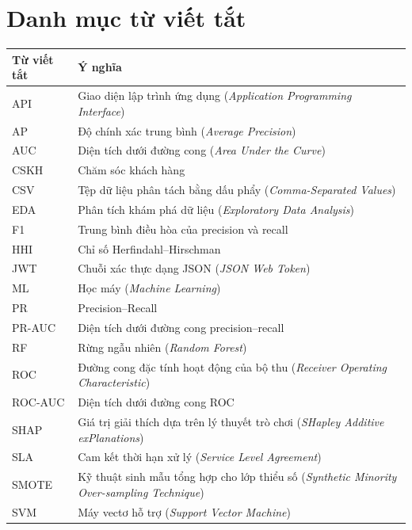 \chapter*{Danh mục từ viết tắt}

\begin{longtable}{@{}p{3.2cm}p{11.5cm}@{}}
\toprule
\textbf{Từ viết tắt} & \textbf{Ý nghĩa} \\
\midrule
\endhead
\bottomrule
\endfoot
API     & Giao diện lập trình ứng dụng (\emph{Application Programming Interface}) \\
AP      & Độ chính xác trung bình (\emph{Average Precision}) \\
AUC     & Diện tích dưới đường cong (\emph{Area Under the Curve}) \\
CSKH    & Chăm sóc khách hàng \\
CSV     & Tệp dữ liệu phân tách bằng dấu phẩy (\emph{Comma-Separated Values}) \\
EDA     & Phân tích khám phá dữ liệu (\emph{Exploratory Data Analysis}) \\
F1      & Trung bình điều hòa của precision và recall \\
HHI     & Chỉ số Herfindahl--Hirschman \\
JWT     & Chuỗi xác thực dạng JSON (\emph{JSON Web Token}) \\
ML      & Học máy (\emph{Machine Learning}) \\
PR      & Precision--Recall \\
PR-AUC  & Diện tích dưới đường cong precision--recall \\
RF      & Rừng ngẫu nhiên (\emph{Random Forest}) \\
ROC     & Đường cong đặc tính hoạt động của bộ thu (\emph{Receiver Operating Characteristic}) \\
ROC-AUC & Diện tích dưới đường cong ROC \\
SHAP    & Giá trị giải thích dựa trên lý thuyết trò chơi (\emph{SHapley Additive exPlanations}) \\
SLA     & Cam kết thời hạn xử lý (\emph{Service Level Agreement}) \\
SMOTE   & Kỹ thuật sinh mẫu tổng hợp cho lớp thiểu số (\emph{Synthetic Minority Over-sampling Technique}) \\
SVM     & Máy vectơ hỗ trợ (\emph{Support Vector Machine}) \\
\end{longtable}
